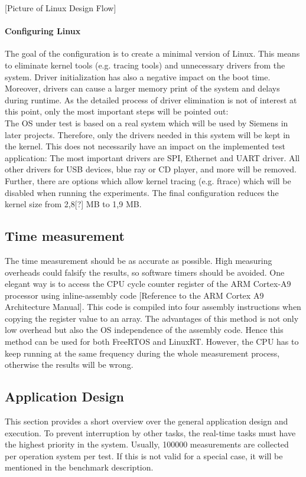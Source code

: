 [Picture of Linux Design Flow]
\paragraph{Configuring Linux}
The goal of the configuration is to create a minimal version of Linux.
This means to eliminate kernel tools (e.g. tracing tools) and unnecessary drivers from the system. 
Driver initialization has also a negative impact on the boot time.
Moreover, drivers can cause a larger memory print of the system and delays during runtime. 
As the detailed process of driver elimination is not of interest at this point, only the most important steps will be pointed out:\\
The \ac{OS} under test is based on a real system which will be used by Siemens in later projects.
Therefore, only the drivers needed in this system will be kept in the kernel.
This does not necessarily have an impact on the implemented test application:
The most important drivers are \ac{SPI}, Ethernet and \ac{UART} driver.
All other drivers for \ac{USB} devices, blue ray or CD player, and more will be removed.
Further, there are options which allow kernel tracing (e.g. ftrace) which will be disabled when running the experiments.  
The final configuration reduces the kernel size from 2,8[?] MB to 1,9 MB. 

\subsection{Time measurement}
The time measurement should be as accurate as possible.
High measuring overheads could falsify the results, so software timers should be avoided. 
One elegant way is to access the \ac{CPU} cycle counter register of the ARM Cortex-A9 processor using inline-assembly code [Reference to the ARM Cortex A9 Architecture Manual].
This code is compiled into four assembly instructions when copying the register value to an array.
The advantages of this method is not only low overhead but also the \ac{OS} independence of the assembly code.
Hence this method can be used for both FreeRTOS and LinuxRT.
However, the \ac{CPU} has to keep running at the same frequency during the whole measurement process, otherwise the results will be wrong.

\subsection{Application Design}
This section provides a short overview over the general application design and execution.
To prevent interruption by other tasks, the real-time tasks must have the highest priority in the system.
Usually, 100000 measurements are collected per operation system per test.
If this is not valid for a special case, it will be mentioned in the benchmark description.
 
